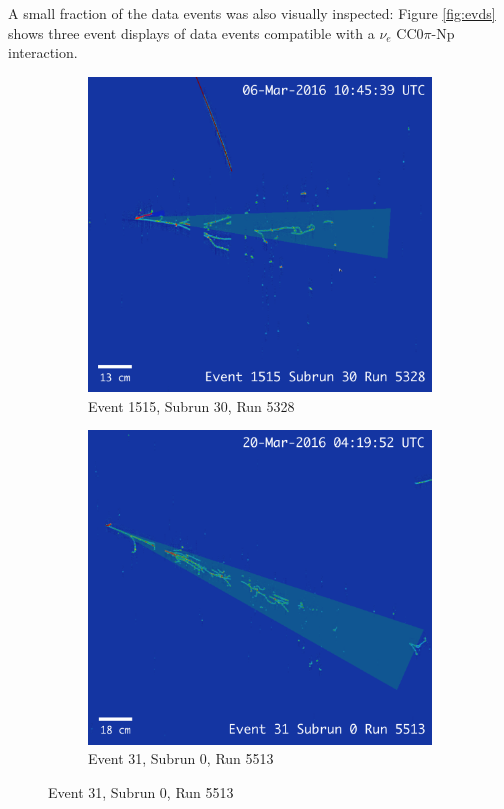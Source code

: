 A small fraction of the data events was also visually inspected: Figure \ref{fig:evds} shows three event displays of data events compatible with a $\nu_{e}$ CC0$\pi$-Np interaction. 

\begin{figure}[htbp]
\centering
  \begin{subfigure}{0.45\textwidth}
  \includegraphics[width=\linewidth]{figures/data3.png}
    \caption{Event 1515, Subrun 30, Run 5328}\end{subfigure}
  \hfill\begin{subfigure}{0.45\textwidth}	
  \includegraphics[width=\linewidth]{figures/data2.png}
  \caption{Event 31, Subrun 0, Run 5513}
\end{subfigure}
\vspace{1em}


\end{figure}
